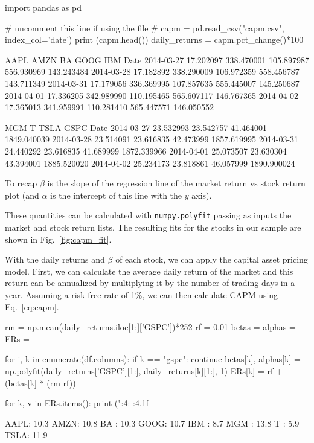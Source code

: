 \begin{ipython}
import pandas as pd

# uncomment this line if using the file
# capm = pd.read_csv("capm.csv", index_col='date')
print (capm.head())
daily_returns = capm.pct_change()*100
\end{ipython}
\begin{ioutput}
                 AAPL        AMZN          BA        GOOG         IBM
Date                                                                    
2014-03-27  17.202097  338.470001  105.897987  556.930969  143.243484   
2014-03-28  17.182892  338.290009  106.972359  558.456787  143.711349   
2014-03-31  17.179056  336.369995  107.857635  555.445007  145.250687   
2014-04-01  17.336205  342.989990  110.195465  565.607117  146.767365   
2014-04-02  17.365013  341.959991  110.281410  565.447571  146.050552   

                  MGM          T       TSLA         GSPC  
Date                                                      
2014-03-27  23.532993  23.542757  41.464001  1849.040039  
2014-03-28  23.514091  23.616835  42.473999  1857.619995  
2014-03-31  24.440292  23.616835  41.689999  1872.339966  
2014-04-01  25.073507  23.630304  43.394001  1885.520020  
2014-04-02  25.234173  23.818861  46.057999  1890.900024  
\end{ioutput}

To recap $\beta$ is the slope of the regression line of the market return vs stock return plot (and $\alpha$ is the intercept of this line with the $y$ axis).

These quantities can be calculated with \texttt{numpy.polyfit} passing as inputs the market and stock return lists. 
The resulting fits for the stocks in our sample are shown in Fig.~\ref{fig:capm_fit}.

With the daily returns and $\beta$ of each stock, we can apply the capital asset pricing model. First, we can calculate the average daily return of the market and this return can be annualized by multiplying it by the number of trading days in a year.
Assuming a risk-free rate of 1\%, we can then calculate CAPM using Eq.~\ref{eq:capm}.

\begin{ipython}
rm = np.mean(daily_returns.iloc[1:]['GSPC'])*252
rf = 0.01
betas = {}
alphas = {}
ERs = {}

for i, k in enumerate(df.columns):
    if k == "gspc":
        continue
    betas[k], alphas[k] = np.polyfit(daily_returns['GSPC'][1:],
                                     daily_returns[k][1:], 1)
    ERs[k] = rf + (betas[k] * (rm-rf))

for k, v in ERs.items():
    print ("{:4}: {:4.1f}%
\end{ipython}
\begin{ioutput}
AAPL: 10.3%
AMZN: 10.8%
BA  : 10.3%
GOOG: 10.7%
IBM :  8.7%
MGM : 13.8%
T   :  5.9%
TSLA: 11.9%
\end{ioutput}

